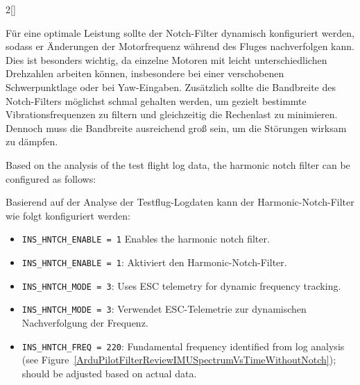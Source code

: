 \begin{paracol}{2}[]
\colger

Für eine optimale Leistung sollte der Notch-Filter dynamisch konfiguriert werden, sodass er Änderungen der Motorfrequenz während des Fluges nachverfolgen kann. Dies ist besonders wichtig, da einzelne Motoren mit leicht unterschiedlichen Drehzahlen arbeiten können, insbesondere bei einer verschobenen Schwerpunktlage oder bei Yaw-Eingaben. Zusätzlich sollte die Bandbreite des Notch-Filters möglichst schmal gehalten werden, um gezielt bestimmte Vibrationsfrequenzen zu filtern und gleichzeitig die Rechenlast zu minimieren. Dennoch muss die Bandbreite ausreichend groß sein, um die Störungen wirksam zu dämpfen.

\coleng

Based on the analysis of the test flight log data, the harmonic notch filter can be configured as follows:

\colger

Basierend auf der Analyse der Testflug-Logdaten kann der Harmonic-Notch-Filter wie folgt konfiguriert werden:
 
\coleng

\begin{itemize}
\item \texttt{INS\_HNTCH\_ENABLE = 1} Enables the harmonic notch filter.
\end{itemize}

\colger

\begin{itemize}
\item \texttt{INS\_HNTCH\_ENABLE = 1}: Aktiviert den Harmonic-Notch-Filter.
\end{itemize}

\coleng

\begin{itemize}
\item \texttt{INS\_HNTCH\_MODE = 3}: Uses ESC telemetry for dynamic frequency tracking.
\end{itemize}

\colger

\begin{itemize}
\item \texttt{INS\_HNTCH\_MODE = 3}: Verwendet ESC-Telemetrie zur dynamischen Nachverfolgung der Frequenz.
\end{itemize}

\coleng

\begin{itemize}
\item \texttt{INS\_HNTCH\_FREQ = 220}: Fundamental frequency identified from log analysis (see Figure~\ref{ArduPilotFilterReviewIMUSpectrumVsTimeWithoutNotch}); should be adjusted based on actual data.
\end{itemize}


\end{paracol}
